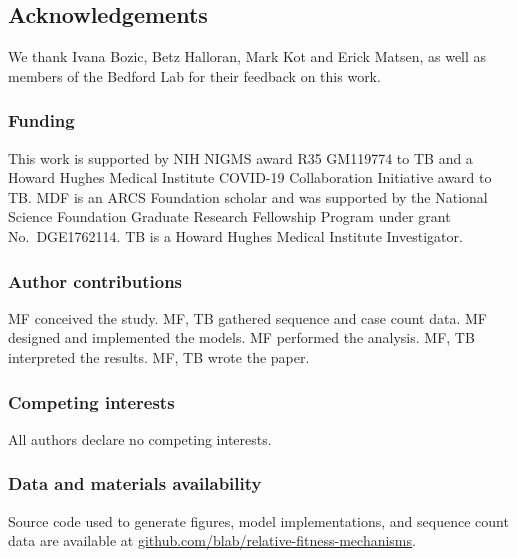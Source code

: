 \documentclass[11pt,oneside,letterpaper]{article}
\begin{document}
\subsection*{Acknowledgements}

We thank Ivana Bozic, Betz Halloran, Mark Kot and Erick Matsen, as well as members of the Bedford Lab for their feedback on this work.

\subsubsection*{Funding}

This work is supported by NIH NIGMS award R35 GM119774 to TB and a Howard Hughes Medical Institute COVID-19 Collaboration Initiative award to TB.
MDF is an ARCS Foundation scholar and was supported by the National Science Foundation Graduate Research Fellowship Program under grant No.\ DGE1762114.
TB is a Howard Hughes Medical Institute Investigator.

\subsubsection*{Author contributions}
MF conceived the study.
MF, TB gathered sequence and case count data.
MF designed and implemented the models.
MF performed the analysis.
MF, TB interpreted the results.
MF, TB wrote the paper.

\subsubsection*{Competing interests}

All authors declare no competing interests.

\subsubsection*{Data and materials availability}

Source code used to generate figures, model implementations, and sequence count data are available at \href{https://github.com/blab/relative-fitness-mechanisms}{github.com/blab/relative-fitness-mechanisms}.




\newpage

\appendix

\setcounter{figure}{0}
\setcounter{table}{0}
\setcounter{page}{1}
\renewcommand{\thefigure}{S\arabic{figure}}
\renewcommand{\thetable}{S\arabic{table}}
\renewcommand{\thepage}{S\arabic{page}}
\renewcommand{\thesubsection}{S\arabic{subsection}}
\end{document}
